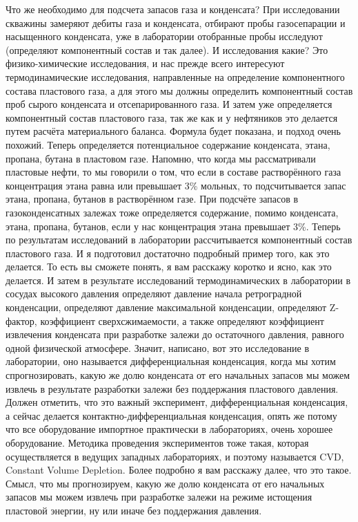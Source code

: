 \documentclass[main.tex]{subfiles}
\begin{document}
Что же необходимо для подсчета запасов газа и конденсата?
При исследовании скважины замеряют дебиты газа и конденсата, отбирают пробы газосепарации и насыщенного конденсата, уже в лаборатории отобранные пробы исследуют (определяют компонентный состав и так далее).
И исследования какие?
Это физико-химические исследования, и нас прежде всего интересуют термодинамические исследования, направленные на определение компонентного состава пластового газа, а для этого мы должны определить компонентный состав проб сырого конденсата и отсепарированного газа.
И затем уже определяется компонентный состав пластового газа, так же как и у нефтяников это делается путем расчёта материального баланса.
Формула будет показана, и подход очень похожий.
Теперь определяется потенциальное содержание конденсата, этана, пропана, бутана в пластовом газе.
Напомню, что когда мы рассматривали пластовые нефти, то мы говорили о том, что если в составе растворённого газа концентрация этана равна или превышает 3\% мольных, то подсчитывается запас этана, пропана, бутанов в растворённом газе.
При подсчёте запасов в газоконденсатных залежах тоже определяется содержание, помимо конденсата, этана, пропана, бутанов, если у нас концентрация этана превышает 3\%.
Теперь по результатам исследований в лаборатории рассчитывается компонентный состав пластового газа.
И я подготовил достаточно подробный пример того, как это делается.
То есть вы сможете понять, я вам расскажу коротко и ясно, как это делается.
И затем в результате исследований термодинамических в лаборатории в сосудах высокого давления определяют давление начала ретроградной конденсации, определяют давление максимальной конденсации, определяют Z-фактор, коэффициент сверхсжимаемости, а также определяют коэффициент извлечения конденсата при разработке залежи до остаточного давления, равного одной физической атмосфере.
Значит, написано, вот это исследование в лаборатории, оно называется дифференциальная конденсация, когда мы хотим спрогнозировать, какую же долю конденсата от его начальных запасов мы можем извлечь в результате разработки залежи без поддержания пластового давления.
Должен отметить, что это важный эксперимент, дифференциальная конденсация, а сейчас делается контактно-дифференциальная конденсация, опять же потому что все оборудование импортное практически в лабораториях, очень хорошее оборудование.
Методика проведения экспериментов тоже такая, которая осуществляется в ведущих западных лабораториях, и поэтому называется CVD, Constant Volume Depletion.
Более подробно я вам расскажу далее, что это такое.
Смысл, что мы прогнозируем, какую же долю конденсата от его начальных запасов мы можем извлечь при разработке залежи на режиме истощения пластовой энергии, ну или иначе без поддержания давления.
\end{document}

